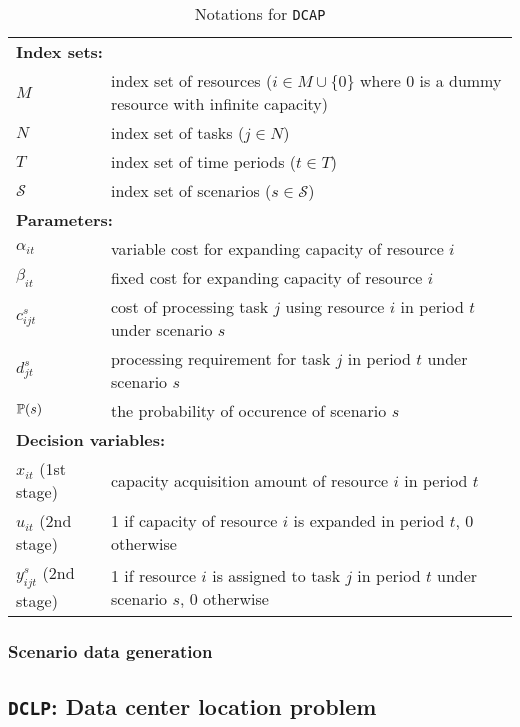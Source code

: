 \begin{table}[H]
	\caption{Notations for \texttt{DCAP}}
	\label{dcap:notation}
	\resizebox{\textwidth}{!}
	{
		\begin{tabular}{ll}
			\toprule
			\multicolumn{2}{l}{\textbf{Index sets:}} \\
			$M$ & index set of resources ($i\in M\cup\{0\}$ where $0$ is a dummy resource with infinite capacity) \\ 
			$N$ & index set of tasks ($j\in N$)\\ 
			$T$ & index set of time periods ($t\in T$)\\
			$\mathcal{S}$ & index set of scenarios ($s\in \mathcal{S}$) \\ \midrule
			\multicolumn{2}{l}{\textbf{Parameters:}} \\
			$\alpha_{it}$ & variable cost for expanding capacity of resource $i$\\ 
			$\beta_{it}$ & fixed cost for expanding capacity of resource $i$ \\ 
			$c_{ijt}^{s}$ & cost of processing task $j$ using resource $i$ in period $t$ under scenario $s$ \\ 
			$d_{jt}^s$	& processing requirement for task $j$ in period $t$ under scenario $s$		\\
			$\operatorname*{\mathbb{P}}(s)$ & \textrm{the probability of occurence of scenario $s$} \\ \midrule
			\multicolumn{2}{l}{\textbf{Decision variables:}} \\
			$x_{it}$ (1st stage) & capacity acquisition amount of resource $i$ in period $t$ \\ 
			$u_{it}$ (2nd stage)& 1 if capacity of resource $i$ is expanded in period $t$, 0 otherwise \\ 
			$y_{ijt}^s$ (2nd stage)& 1 if resource $i$ is assigned to task $j$ in period $t$ under scenario $s$, 0 otherwise\\
			\bottomrule
		\end{tabular}
	}
\end{table} 

\subsubsection{Scenario data generation}


\subsection{\texttt{DCLP}: Data center location problem}


